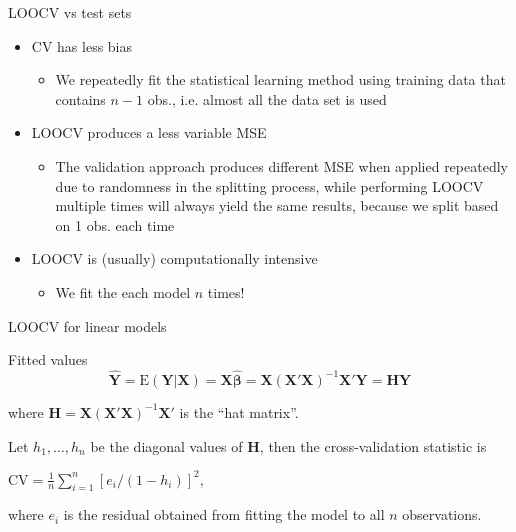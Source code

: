 \documentclass[14pt]{beamer}
\begin{document}
\begin{frame}{LOOCV vs test sets}
\begin{itemize}
\item CV has less bias
\begin{itemize}
\item We repeatedly fit the statistical learning method using training data
that contains $n-1$ obs., i.e. almost all the data set is used
\end{itemize}
\item LOOCV produces a less variable MSE
\begin{itemize}
\item The validation approach produces different MSE when applied
repeatedly due to randomness in the splitting process, while
performing LOOCV multiple times will always yield the same
results, because we split based on 1 obs. each time
\end{itemize}
\item LOOCV is (usually) computationally intensive
\begin{itemize}
\item We fit the each model $n$ times! 
\end{itemize}
\end{itemize}
\end{frame}

\begin{frame}{LOOCV for linear models}


\begin{block}{Fitted values}\vspace*{-0.2cm}
\[
\hat{\bm{Y}} =
\text{E}(\bm{Y}|\bm{X}) =
\bm{X}\hat{\bm{\beta}} = \bm{X}(\bm{X}'\bm{X})^{-1}\bm{X}'\bm{Y} = \bm{H}\bm{Y}
\]
\end{block}
where $\bm{H} = \bm{X}(\bm{X}'\bm{X})^{-1}\bm{X}'$ is the ``hat matrix''.\pause


Let $h_1,\dots,h_n$ be the diagonal values of $\bm{H}$, then the cross-validation statistic is
\begin{block}{}
\centerline{$\displaystyle
\text{CV} = \frac1n\sum_{i=1}^n[e_i/(1-h_i)]^2,$}
\end{block}
where $e_i$ is the residual obtained from fitting the model to all $n$ observations.


\end{frame}
\end{document}
